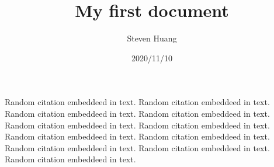 \documentclass[12pt]{article}
\title{ My first document}
\date{2020/11/10}
\author{Steven Huang}
\begin{document}
\maketitle
\newpage
{}

Random citation \cite{otsu1979threshold} embeddeed in text.
Random citation \cite{pedregosa2011scikit} embeddeed in text.
Random citation \cite{liu2006region} embeddeed in text.
Random citation \cite{mizushima2013image} embeddeed in text.
Random citation \cite{ray1999determination} embeddeed in text.
Random citation \cite{minaee2020image} embeddeed in text.
Random citation \cite{long2015fully} embeddeed in text.
Random citation \cite{noh2015learning} embeddeed in text.
Random citation \cite{badrinarayanan2017segnet} embeddeed in text.
Random citation \cite{ronneberger2015u} embeddeed in text.
Random citation \cite{milletari2016v} embeddeed in text.

\newpage
{}

  
%
\end{document}
